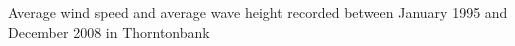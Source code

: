 \label{fig:windwave}
Average wind speed and average wave height recorded between January 1995 and December 2008 in Thorntonbank